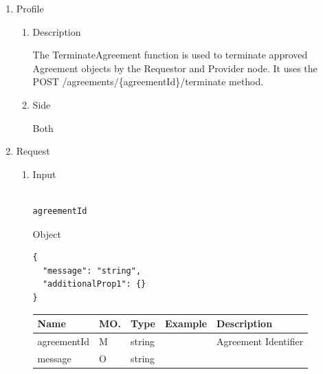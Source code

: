\newpage


\begin{enumerate}

\item Profile

\begin{enumerate}

\item Description

The TerminateAgreement function is used to terminate approved Agreement objects by the Requestor and Provider node. 
It uses the POST /agreements/\{agreementId\}/terminate method.

\item Side

Both

\end{enumerate}

\item Request

\begin{enumerate}

\item Input

\begin{tcolorbox}[boxrule=0pt, frame empty]
\begin{verbatim}

agreementId

\end{verbatim}
\end{tcolorbox}

Object
\begin{tcolorbox}[boxrule=0pt, frame empty]
\begin{verbatim}
{
  "message": "string",
  "additionalProp1": {}
}
\end{verbatim}
\end{tcolorbox}

\begin{center}
\begin{tabular}{|p{3cm}|l|p{3cm}|p{3cm}|p{4cm}|} 
\hline
\rowcolor{lightgray}	Name	& MO.	& Type	& Example & 	Description \\
\hline

agreementId		& M & 	string				&		& 	Agreement Identifier \\
\hline

message			& O	& 	string				&		&	 	\\ 
\hline


\end{tabular}
\end{center}
\end{enumerate}
\end{enumerate}
